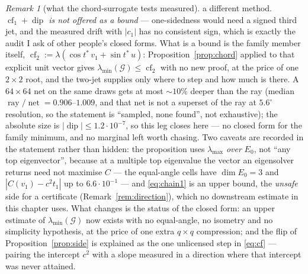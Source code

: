 \documentclass[11pt]{article}
\theoremstyle{remark}
\newtheorem{remark}{Remark}[section]
\newcommand{\Gr}{\mathcal{G}}
\begin{document}
\begin{remark}[what the chord-surrogate tests measured]
a different method. \emph{$\operatorname{cf}_1+\operatorname{dip}$ is not offered as a bound} ---
one-sidedness would need a signed third jet, and the measured drift with $|c_1|$ has no consistent sign,
which is exactly the audit I ask of other people's closed forms. What is a bound is the family member
itself, $\operatorname{cf}_2:=\lambda(\cos t^{*}\,v_1+\sin t^{*}\,u)$: Proposition~\ref{prop:chord}
applied to that explicit unit vector gives $\lambda_{\min}(\Gr)\le\operatorname{cf}_2$ with no new proof,
at the price of one $2\times2$ root, and the two-jet supplies only where to step and how much is there.
A $64\times64$ net on the same draws gets at most $\sim10\%$ deeper than the ray (median
$\operatorname{ray}/\operatorname{net}=0.906$--$1.009$, and that net is not a superset of the ray at
$5.6^{\circ}$ resolution, so the statement is ``sampled, none found'', not exhaustive); the absolute size
is $|\operatorname{dip}|\le1.2\cdot10^{-7}$, so this leg closes here --- no closed form for the family
minimum, and no marginal left worth chasing. Two caveats are recorded in the statement rather than hidden: the proposition uses
$\lambda_{\max}$ \emph{over} $E_0$, not ``any top eigenvector'', because at a multiple top eigenvalue
the vector an eigensolver returns need not maximise $C$ --- the equal-angle cells have $\dim E_0=3$ and
$|C(v_1)-c^{2}t_1|$ up to $6.6\cdot10^{-1}$ --- and \eqref{eq:chain1} is an upper bound, the
\emph{unsafe} side for a certificate (Remark~\ref{rem:direction}), which no downstream estimate in this
chapter uses. What changes is the status of the closed form: an upper estimate of
$\lambda_{\min}(\Gr)$ now exists with no equal-angle, no isometry and no simplicity hypothesis, at the
price of one extra $q\times q$ compression; and the flip of Proposition~\ref{prop:side} is explained as
the one unlicensed step in \eqref{eq:cf} --- pairing the intercept $c^{2}$ with a slope measured in a
direction where that intercept was never attained.
\end{remark}
\end{document}

